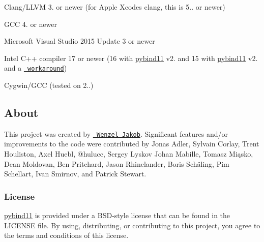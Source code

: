 \begin{DoxyEnumerate}
\item Clang/\+L\+L\+VM 3. or newer (for Apple Xcode\textquotesingle{}s clang, this is 5.. or newer)
\item G\+CC 4. or newer
\item Microsoft Visual Studio 2015 Update 3 or newer
\item Intel C++ compiler 17 or newer (16 with \mbox{\hyperlink{namespacepybind11}{pybind11}} v2. and 15 with \mbox{\hyperlink{namespacepybind11}{pybind11}} v2. and a \href{https://github.com/pybind/pybind11/issues/276}{\texttt{ workaround}})
\item Cygwin/\+G\+CC (tested on 2..)
\end{DoxyEnumerate}

\subsection*{About}

This project was created by \href{http://rgl.epfl.ch/people/wjakob}{\texttt{ Wenzel Jakob}}. Significant features and/or improvements to the code were contributed by Jonas Adler, Sylvain Corlay, Trent Houliston, Axel Huebl, @hulucc, Sergey Lyskov Johan Mabille, Tomasz Miąsko, Dean Moldovan, Ben Pritchard, Jason Rhinelander, Boris Schäling, Pim Schellart, Ivan Smirnov, and Patrick Stewart.

\subsubsection*{License}

\mbox{\hyperlink{namespacepybind11}{pybind11}} is provided under a B\+S\+D-\/style license that can be found in the {\ttfamily L\+I\+C\+E\+N\+SE} file. By using, distributing, or contributing to this project, you agree to the terms and conditions of this license. 